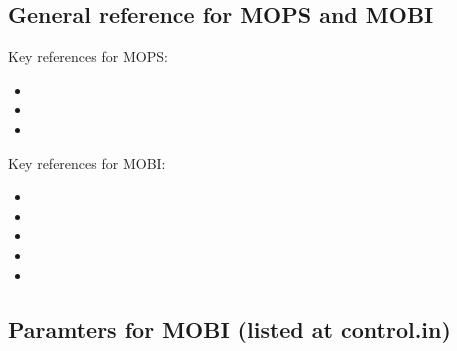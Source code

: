 \documentclass[a4paper]{article}
\def\noin{\noindent }
\begin{document}
\subsection{General reference for MOPS and MOBI}
\noin Key references for MOPS:
\begin{itemize}
\item {}
\item {}
\item {}
\end{itemize}

\noin Key references for MOBI:
\begin{itemize}
\item {}
\item {}
\item {}
\item {}
\item {}
\end{itemize}

\subsection{Paramters for MOBI (listed at control.in)} \label{subsection:mobi_params}
\end{document}
